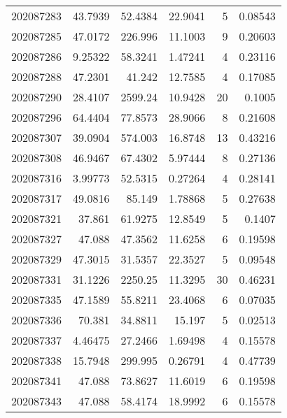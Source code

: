 \begin{tabular}{rrrrrr}
 202087283 &         43.7939  &       52.4384 &           22.9041  &           5 & 0.08543 \\
 202087285 &         47.0172  &      226.996  &           11.1003  &           9 & 0.20603 \\
 202087286 &          9.25322 &       58.3241 &            1.47241 &           4 & 0.23116 \\
 202087288 &         47.2301  &       41.242  &           12.7585  &           4 & 0.17085 \\
 202087290 &         28.4107  &     2599.24   &           10.9428  &          20 & 0.1005  \\
 202087296 &         64.4404  &       77.8573 &           28.9066  &           8 & 0.21608 \\
 202087307 &         39.0904  &      574.003  &           16.8748  &          13 & 0.43216 \\
 202087308 &         46.9467  &       67.4302 &            5.97444 &           8 & 0.27136 \\
 202087316 &          3.99773 &       52.5315 &            0.27264 &           4 & 0.28141 \\
 202087317 &         49.0816  &       85.149  &            1.78868 &           5 & 0.27638 \\
 202087321 &         37.861   &       61.9275 &           12.8549  &           5 & 0.1407  \\
 202087327 &         47.088   &       47.3562 &           11.6258  &           6 & 0.19598 \\
 202087329 &         47.3015  &       31.5357 &           22.3527  &           5 & 0.09548 \\
 202087331 &         31.1226  &     2250.25   &           11.3295  &          30 & 0.46231 \\
 202087335 &         47.1589  &       55.8211 &           23.4068  &           6 & 0.07035 \\
 202087336 &         70.381   &       34.8811 &           15.197   &           5 & 0.02513 \\
 202087337 &          4.46475 &       27.2466 &            1.69498 &           4 & 0.15578 \\
 202087338 &         15.7948  &      299.995  &            0.26791 &           4 & 0.47739 \\
 202087341 &         47.088   &       73.8627 &           11.6019  &           6 & 0.19598 \\
 202087343 &         47.088   &       58.4174 &           18.9992  &           6 & 0.15578 \\

\end{tabular}
